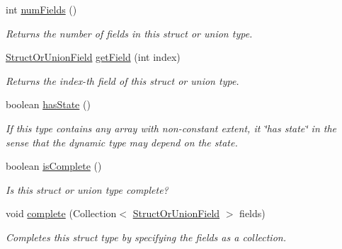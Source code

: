 \begin{DoxyCompactItemize}
\item 
int \hyperlink{classedu_1_1udel_1_1cis_1_1vsl_1_1civl_1_1model_1_1common_1_1type_1_1CommonStructOrUnionType_a0aab5f996fb71241d5003ad7e673cb5b}{num\+Fields} ()
\begin{DoxyCompactList}\small\item\em Returns the number of fields in this struct or union type. \end{DoxyCompactList}\item 
\hyperlink{interfaceedu_1_1udel_1_1cis_1_1vsl_1_1civl_1_1model_1_1IF_1_1type_1_1StructOrUnionField}{Struct\+Or\+Union\+Field} \hyperlink{classedu_1_1udel_1_1cis_1_1vsl_1_1civl_1_1model_1_1common_1_1type_1_1CommonStructOrUnionType_a785f632973f73117f7ba979068fa37ca}{get\+Field} (int index)
\begin{DoxyCompactList}\small\item\em Returns the index-\/th field of this struct or union type. \end{DoxyCompactList}\item 
boolean \hyperlink{classedu_1_1udel_1_1cis_1_1vsl_1_1civl_1_1model_1_1common_1_1type_1_1CommonStructOrUnionType_ad86d09f35c208d49c830dc4524edec80}{has\+State} ()
\begin{DoxyCompactList}\small\item\em If this type contains any array with non-\/constant extent, it \char`\"{}has state\char`\"{} in the sense that the dynamic type may depend on the state. \end{DoxyCompactList}\item 
boolean \hyperlink{classedu_1_1udel_1_1cis_1_1vsl_1_1civl_1_1model_1_1common_1_1type_1_1CommonStructOrUnionType_aad630d03a338e83bfac66c2022bce3fc}{is\+Complete} ()
\begin{DoxyCompactList}\small\item\em Is this struct or union type complete? \end{DoxyCompactList}\item 
void \hyperlink{classedu_1_1udel_1_1cis_1_1vsl_1_1civl_1_1model_1_1common_1_1type_1_1CommonStructOrUnionType_a9b0ddb6ba5ac52b6c331f1c72fbd21f2}{complete} (Collection$<$ \hyperlink{interfaceedu_1_1udel_1_1cis_1_1vsl_1_1civl_1_1model_1_1IF_1_1type_1_1StructOrUnionField}{Struct\+Or\+Union\+Field} $>$ fields)
\begin{DoxyCompactList}\small\item\em Completes this struct type by specifying the fields as a collection. \end{DoxyCompactList}\item 

\end{DoxyCompactItemize}
